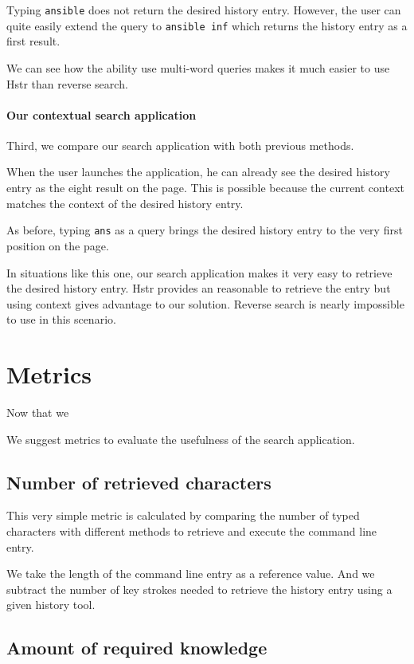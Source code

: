 Typing \verb|ansible| does not return the desired history entry. However, the user can quite easily extend the query to \verb|ansible inf| which returns the history entry as a first result. 

We can see how the ability use multi-word queries makes it much easier to use Hstr than reverse search.

\paragraph{Our contextual search application}

Third, we compare our search application with both previous methods. 

When the user launches the application, he can already see the desired history entry as the eight result on the page. This is possible because the current context matches the context of the desired history entry. 

As before, typing \verb|ans| as a query brings the desired history entry to the very first position on the page. 

In situations like this one, our search application makes it very easy to retrieve the desired history entry. Hstr provides an reasonable to retrieve the entry but using context gives advantage to our solution. Reverse search is nearly impossible to use in this scenario.



\section{Metrics}

Now that we 

We suggest metrics to evaluate the usefulness of the search application.



\subsection{Number of retrieved characters}

This very simple metric is calculated by comparing the number of typed characters with different methods to retrieve and execute the command line entry. 

We take the length of the command line entry as a reference value. And we subtract the number of key strokes needed to retrieve the history entry using a given history tool.

\subsection{Amount of required knowledge}


